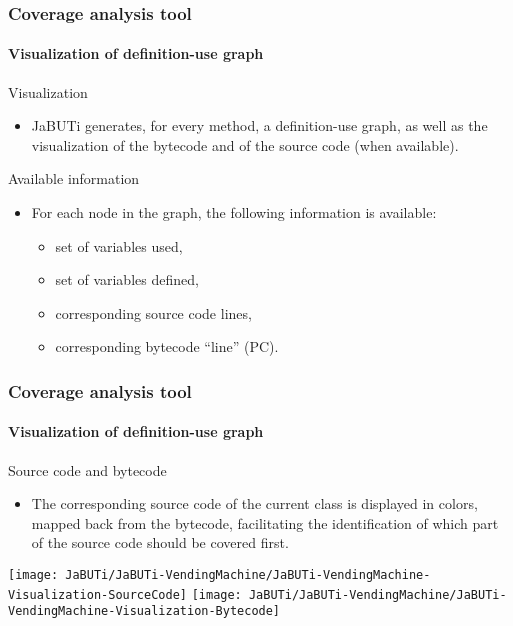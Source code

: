 \begin{frame}[parent={cmap:coverage-analysis-tool},hasnext=true,hasprev=true]
\frametitle{Coverage analysis tool}
\framesubtitle{Visualization of definition-use graph}
\label{concept:jabuti-visualization}

\begin{block:fact}{Visualization}
\begin{itemize}
	\item JaBUTi generates, for every method, a definition-use graph,
	 as well as the visualization of the bytecode and of the source code
	 (when available).
\end{itemize}
\end{block:fact}

\begin{block:fact}{Available information}
\begin{itemize}
	\item For each node in the graph, the following information is available:
	\begin{itemize}
		\item set of variables used,
		\item set of variables defined,
		\item corresponding source code lines,
		\item corresponding bytecode ``line'' (PC).
	\end{itemize}
\end{itemize}
\end{block:fact}
\end{frame}


\begin{frame}
\frametitle{Coverage analysis tool}
\framesubtitle{Visualization of definition-use graph}

\begin{block:fact}{Source code and bytecode}
\begin{itemize}
	\item The corresponding source code of the current class is displayed in
	colors, mapped back from the bytecode, facilitating the
	identification of which part of the source code should be covered first.
\end{itemize}
\end{block:fact}

\begin{center}
\texttt{[image: JaBUTi/JaBUTi-VendingMachine/JaBUTi-VendingMachine-Visualization-SourceCode]}
\texttt{[image: JaBUTi/JaBUTi-VendingMachine/JaBUTi-VendingMachine-Visualization-Bytecode]}
\end{center}
\end{frame}


